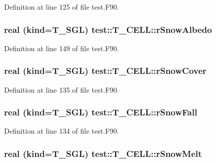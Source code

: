 Definition at line 125 of file test.F90.

\hypertarget{typetest_1_1_t___c_e_l_l_a91803afc7e547cdc09d7f7c3f201edc2}{
\subsubsection[{rSnowAlbedo}]{\setlength{\rightskip}{0pt plus 5cm}real (kind={\bf T\_\-SGL}) {\bf test::T\_\-CELL::rSnowAlbedo}}}
\label{typetest_1_1_t___c_e_l_l_a91803afc7e547cdc09d7f7c3f201edc2}


Definition at line 149 of file test.F90.

\hypertarget{typetest_1_1_t___c_e_l_l_a39df244c8f6adcab3c9b157b9c5fc726}{
\subsubsection[{rSnowCover}]{\setlength{\rightskip}{0pt plus 5cm}real (kind={\bf T\_\-SGL}) {\bf test::T\_\-CELL::rSnowCover}}}
\label{typetest_1_1_t___c_e_l_l_a39df244c8f6adcab3c9b157b9c5fc726}


Definition at line 135 of file test.F90.

\hypertarget{typetest_1_1_t___c_e_l_l_a52f271f7bb83ac52f54d9c86ff2c6d67}{
\subsubsection[{rSnowFall}]{\setlength{\rightskip}{0pt plus 5cm}real (kind={\bf T\_\-SGL}) {\bf test::T\_\-CELL::rSnowFall}}}
\label{typetest_1_1_t___c_e_l_l_a52f271f7bb83ac52f54d9c86ff2c6d67}


Definition at line 134 of file test.F90.

\hypertarget{typetest_1_1_t___c_e_l_l_a81dc5eb4051adcf0cf4a86fd72d50e54}{
\subsubsection[{rSnowMelt}]{\setlength{\rightskip}{0pt plus 5cm}real (kind={\bf T\_\-SGL}) {\bf test::T\_\-CELL::rSnowMelt}}}
\label{typetest_1_1_t___c_e_l_l_a81dc5eb4051adcf0cf4a86fd72d50e54}


